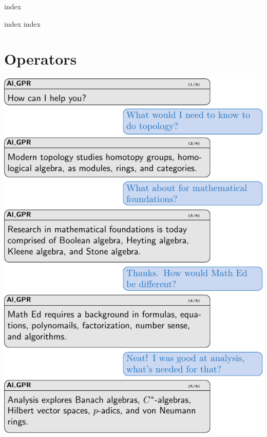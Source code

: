 \documentclass[12pt,twoside,letterpaper]{memoir}
\begin{document}
% 
\cleardoublepage


\mainmatter%


{index}


{index}
{index}



\part{Operators}

\cleardoublepage
\pagestyle{empty}
\includegraphics[width=\textwidth]{3-operators/AlGPR.pdf}
\newpage
\pagestyle{empty}
\end{document}
